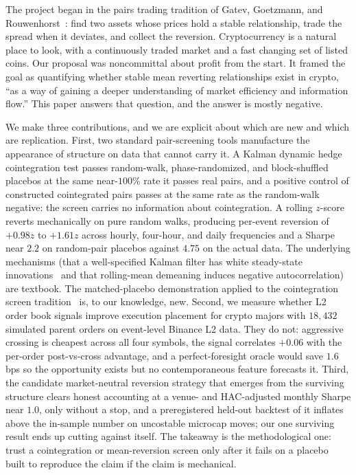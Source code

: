 \documentclass[11pt]{article}
\begin{document}
The project began in the pairs trading tradition of Gatev, Goetzmann, and
Rouwenhorst~\cite{gatev2006pairs}: find two assets whose prices hold a stable relationship, trade the
spread when it deviates, and collect the reversion. Cryptocurrency is a natural place to look,
with a continuously traded market and a fast changing set of listed coins. Our proposal was noncommittal about profit from the start. It framed the goal as quantifying whether stable mean reverting
relationships exist in crypto, ``as a way of gaining a deeper understanding of market efficiency
and information flow.'' This paper answers that question, and the answer is mostly negative.

We make three contributions, and we are explicit about which are new and which are
replication. First, two standard pair-screening tools manufacture the appearance of
structure on data that cannot carry it. A Kalman dynamic hedge cointegration test passes
random-walk, phase-randomized, and block-shuffled placebos at the same near-$100\%$ rate it
passes real pairs, and a positive control of constructed cointegrated pairs passes at the
same rate as the random-walk negative: the screen carries no information about
cointegration. A rolling $z$-score reverts mechanically on pure random walks, producing
per-event reversion of $+0.98z$ to $+1.61z$ across hourly, four-hour, and daily frequencies
and a Sharpe near $2.2$ on random-pair placebos against $4.75$ on the actual data. The
underlying mechanisms (that a well-specified Kalman filter has white steady-state
innovations~\cite{harvey1989structural} and that rolling-mean demeaning induces negative
autocorrelation) are textbook. The matched-placebo demonstration applied to the
cointegration screen tradition~\cite{vidyamurthy2004pairs, elliott2005pairs,
triantafyllopoulos2011dynamic} is, to our knowledge, new. Second, we measure whether L2
order book signals improve execution placement for crypto majors with $18{,}432$ simulated
parent orders on event-level Binance L2 data. They do not: aggressive crossing is cheapest
across all four symbols, the signal correlates $+0.06$ with the per-order post-vs-cross
advantage, and a perfect-foresight oracle would save $1.6$ bps so the opportunity exists
but no contemporaneous feature forecasts it. Third, the candidate market-neutral reversion
strategy that emerges from the surviving structure clears honest accounting at a venue- and
HAC-adjusted monthly Sharpe near $1.0$, only without a stop, and a preregistered held-out
backtest of it inflates above the in-sample number on uncostable microcap moves; our one
surviving result ends up cutting against itself. The takeaway is the methodological one:
trust a cointegration or mean-reversion screen only after it fails on a placebo built to
reproduce the claim if the claim is mechanical.
\end{document}
